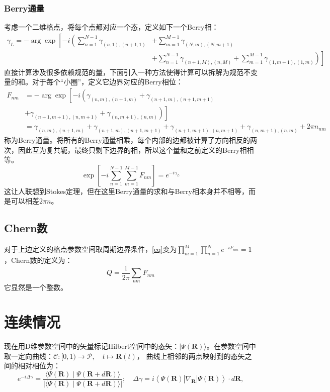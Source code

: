 \documentclass[12pt, a4paper, oneside]{ctexbook}
\begin{document}
    \subsubsection*{Berry通量}
	考虑一个二维格点，将每个点都对应一个态，定义如下一个Berry相：
	\begin{equation}
		\begin{aligned}
			\gamma_L=-\arg \exp \left[-i\left(\sum_{n=1}^{N-1} \gamma_{(n, 1),(n+1,1)}\right.\right. & +\sum_{m=1}^{M-1} \gamma_{(N, m),(N, m+1)} \\
			& \left.\left.+\sum_{n=1}^{N-1} \gamma_{(n+1, M),(n, M)}+\sum_{m=1}^{M-1} \gamma_{(1, m+1),(1, m)}\right)\right]
			\end{aligned}
	\end{equation}
	直接计算涉及很多依赖规范的量，下面引入一种方法使得计算可以拆解为规范不变量的和。对于每个“小圈”，定义它边界对应的Berry相位：
	\begin{equation}
		\begin{aligned}
			F_{n m}&=-\arg \exp \left[-i\left(\gamma_{(n, m),(n+1, m)}+\right.\right.  \gamma_{(n+1, m),(n+1, m+1)} \\
			& \left.\left.+\gamma_{(n+1, m+1),(n, m+1)}+\gamma_{(n, m+1),(n, m)}\right)\right]\\
			& =\gamma_{(n, m),(n+1, m)}+\gamma_{(n+1, m),(n+1, m+1)}+\gamma_{(n+1, m+1),(n, m+1)}+\gamma_{(n, m+1),(n, m)}+2\pi n_{nm}
			\end{aligned}
	\end{equation}
	称为Berry通量。将所有的Berry通量相乘，每个内部的边都被计算了方向相反的两次，因此互为复共轭，最终只剩下边界的相，所以这个量和之前定义的Berry相相等。
	\begin{equation}
		\exp \left[-i \sum_{n=1}^{N-1} \sum_{m=1}^{M-1} F_{n m}\right]=e^{-i \gamma_L}
		\label{eq}
	\end{equation}
	这让人联想到Stokes定理，但在这里Berry通量的求和与Berry相本身并不相等，而是可以相差$ 2\pi n $。
	\subsection*{Chern数}
	对于上边定义的格点参数空间取周期边界条件，\eqref{eq}变为$ \prod_{m=1}^M \prod_{n=1}^N e^{-i F_{n m}}=1 $ ，Chern数的定义为：
	\begin{equation}
		Q=\frac{1}{2 \pi} \sum_{n m} F_{n m}
	\end{equation}
	它显然是一个整数。
	\section{连续情况}
	现在用D维参数空间中的矢量标记Hilbert空间中的态矢：$ |\Psi(\mathbf{R})\rangle $。在参数空间中取一定向曲线：$ \mathscr{C}:[0,1) \rightarrow \mathscr{P}, \quad t \mapsto \mathbf{R}(t) $，
	曲线上相邻的两点映射到的态矢之间的相对相位为：\\
	\begin{equation}
		e^{-i \Delta \gamma}=\frac{\langle\Psi(\mathbf{R}) \mid \Psi(\mathbf{R}+d \mathbf{R})\rangle}{|\langle\Psi(\mathbf{R}) \mid \Psi(\mathbf{R}+d \mathbf{R})\rangle|} ; \quad \Delta \gamma=i\left\langle\Psi(\mathbf{R})\left|\nabla_{\mathbf{R}}\right| \Psi(\mathbf{R})\right\rangle \cdot d \mathbf{R},
	\end{equation}
\end{document}
